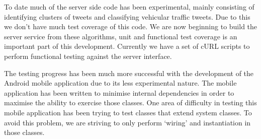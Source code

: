 To date much of the server side code has been experimental, mainly consisting
of identifying clusters of tweets and classifying vehicular traffic tweets. Due
to this we don't have much test coverage of this code. We are now beginning to
build the server service from these algorithms, unit and functional test
coverage is an important part of this development. Currently we have a set of
cURL scripts to perform functional testing against the server interface.

The testing progress has been much more successful with the development of the
Android mobile application due to its less experimental nature. The mobile
application has been written to minimise internal dependencies in order to
maximise the ability to exercise those classes. One area of difficulty in
testing this mobile application has been trying to test classes that extend
system classes. To avoid this problem, we are striving to only perform `wiring'
and instantiation in those classes.
